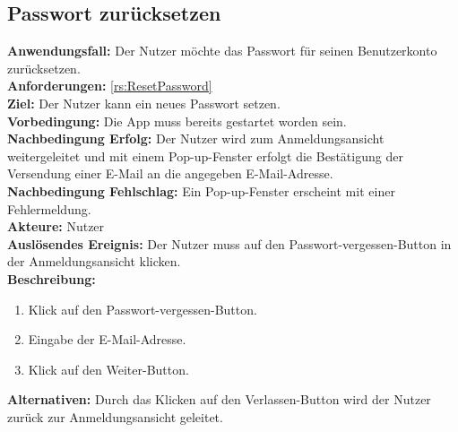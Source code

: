 \documentclass[parskip=full]{scrartcl}
\begin{document}
\subsection{Passwort zurücksetzen}
\textbf{Anwendungsfall:} Der Nutzer möchte das Passwort für seinen Benutzerkonto zurücksetzen.\\
\textbf{Anforderungen:} \ref{rs:ResetPassword}\\
\textbf{Ziel:} Der Nutzer kann ein neues Passwort setzen.\\
\textbf{Vorbedingung:} Die App muss bereits gestartet worden sein.\\
\textbf{Nachbedingung Erfolg:} Der Nutzer wird zum Anmeldungsansicht weitergeleitet und mit einem Pop-up-Fenster erfolgt die Bestätigung der Versendung einer E-Mail an die angegeben E-Mail-Adresse.\\
\textbf{Nachbedingung Fehlschlag:} Ein Pop-up-Fenster erscheint mit einer Fehlermeldung.\\
\textbf{Akteure:} Nutzer\\
\textbf{Auslösendes Ereignis:} Der Nutzer muss auf den Passwort-vergessen-Button in der Anmeldungsansicht klicken.\\

\textbf{Beschreibung:}
\begin{enumerate}
    \item Klick auf den Passwort-vergessen-Button.
    \item Eingabe der E-Mail-Adresse.
    \item Klick auf den Weiter-Button.
\end{enumerate}
\textbf{Alternativen:} Durch das Klicken auf den Verlassen-Button wird der Nutzer zurück zur Anmeldungsansicht geleitet.
\newpage
\end{document}
